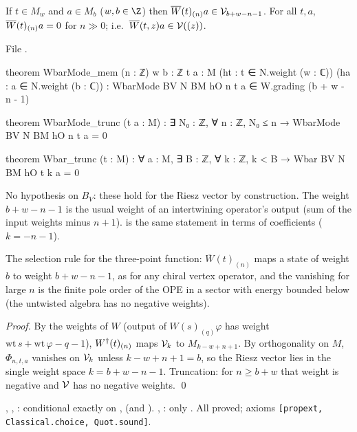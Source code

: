 \begin{theorem}\label{ch09:thm:Wbargrade}
If $t\in M_w$ and $a\in M_b$ ($w,b\in\Z$) then $\overline{W}(t)_{(n)}a\in\mathcal{V}_{b+w-n-1}$. For all $t,a$,
$\overline{W}(t)_{(n)}a=0$ for $n\gg0$; i.e.\ $\overline{W}(t,z)a\in\mathcal{V}((z))$.
\end{theorem}
\noindent File .
\begin{leancode}
theorem WbarMode_mem (n : ℤ) {w b : ℤ} {t a : M} (ht : t ∈ N.weight (w : ℂ))
    (ha : a ∈ N.weight (b : ℂ)) : WbarMode BV N BM hO n t a ∈ W.grading (b + w - n - 1)

theorem WbarMode_trunc (t a : M) : ∃ N₀ : ℤ, ∀ n : ℤ, N₀ ≤ n → WbarMode BV N BM hO n t a = 0

theorem Wbar_trunc (t : M) : ∀ a : M, ∃ B : ℤ, ∀ k : ℤ, k < B → Wbar BV N BM hO t k a = 0
\end{leancode}
\begin{dictionary}
No hypothesis on $B_V$: these hold for the Riesz vector by construction. The weight
$b+w-n-1$ is the usual weight of an intertwining operator's output (sum of the input weights minus
$n+1$).  is the same statement in terms of coefficients ($k=-n-1$).
\end{dictionary}
\begin{physics}
The selection rule for the three-point function: $\overline W(t)_{(n)}$ maps a state of weight $b$ to weight $b+w-n-1$, as for any chiral vertex operator, and the vanishing for large $n$ is the finite pole order of the OPE in a sector with energy bounded below (the untwisted algebra has no negative weights).
\end{physics}

\noindent\emph{Proof.} By the weights of $W$ (output of $W(s)_{(q)}\varphi$ has weight
$\mathrm{wt}\,s+\mathrm{wt}\,\varphi-q-1$), $W^{\dagger}(t)_{(n)}$ maps $\mathcal{V}_k$ to $M_{k-w+n+1}$. By
orthogonality on $M$, $\Phi_{n,t,a}$ vanishes on $\mathcal{V}_k$ unless $k-w+n+1=b$, so the Riesz vector
lies in the single weight space $k=b+w-n-1$. Truncation: for $n\ge b+w$ that weight is negative and
$\mathcal{V}$ has no negative weights. \qed

\begin{status}
, , : conditional exactly on
,  (and ). , : only .
All proved; axioms \texttt{[propext, Classical.choice, Quot.sound]}.
\end{status}


